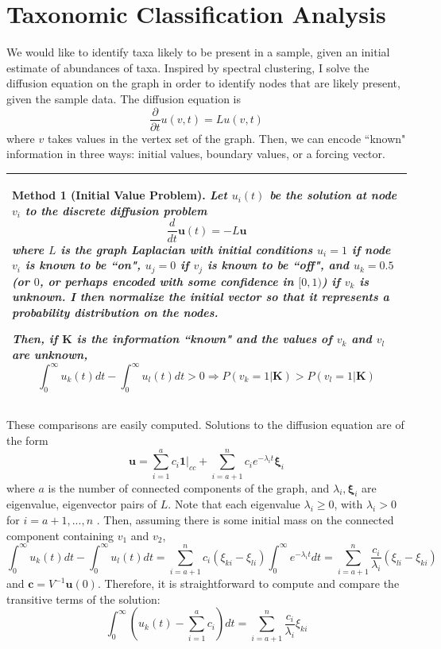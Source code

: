 \documentclass[10pt]{article}
\newtheorem{method}{Method}
\theoremstyle{definition}
\numberwithin{theorem}{section}
\numberwithin{definition}{section}
\numberwithin{lemma}{section}
\numberwithin{corollary}{section}
\numberwithin{clm}{section}
\numberwithin{rmk}{section}
\newenvironment{inbox2}
{\begin{center}
		\begin{tabular}{|p{0.9\textwidth}|}
			\hline \vspace{-0.5 cm}
		}
		{ 
			\\ \hline
		\end{tabular} 
	\end{center}
}
\renewcommand{\b}{\bm}
\begin{document}
\section{Taxonomic Classification Analysis}


We would like to identify taxa likely to be present in a sample, given an initial estimate of abundances of taxa. Inspired by spectral clustering, I solve the diffusion equation on the graph in order to identify nodes that are likely present, given the sample data. The diffusion equation is
\[
\frac{\partial}{\partial t} u(v,t) = L u(v,t)
\]
where $v$ takes values in the vertex set of the graph. Then, we can encode ``known" information in three ways: initial values, boundary values, or a forcing vector.

\begin{inbox2}
	\begin{method}[Initial Value Problem]\label{initalCond}
		Let $u_i(t)$ be the solution at node $v_i$ to the discrete diffusion problem
		\[
		\frac{d}{dt}\b{u}(t)  = - L\b{u}
		\]
		where $L$ is the  graph Laplacian with initial conditions $u_i = 1$ if node $v_i$ is known to be ``on", $u_j = 0$ if $v_j$ is known to be ``off", and $u_k = 0.5$ (or $0$, or perhaps encoded with some confidence in $[0,1)$) if $v_k$ is unknown. I then normalize the initial vector so that it represents a probability distribution on the nodes.
		
		Then, if $\b{K}$ is the information ``known" and the values of $v_{k}$ and $v_{l}$ are unknown,
		\[
		\int_0^{\infty} u_k(t) dt - \int_0^{\infty} u_l(t) dt >  0 \Rightarrow  P(v_k=  1|\b{K}) > P(v_l = 1|\b{K})
		\]
	\end{method}
\end{inbox2}
These comparisons are easily computed. Solutions to the diffusion equation are of the form
\[
\b{u} = \sum_{i=1}^a c_i \b{1}|_{cc} + \sum_{i=a+1}^n c_i e^{-\lambda_i t} \b{\xi}_i 
\]
where $a$ is the number of connected components of the graph, and $\lambda_i,\b{\xi}_i$ are eigenvalue, eigenvector pairs of $L$. Note that each eigenvalue $\lambda_i \geq 0$, with $\lambda_i>0$ for $i = a+1,...,n$ \cite{vonLuxburg2007}. Then, assuming there is some initial mass on the connected component containing $v_1$ and $v_2$, 
\[
\int_0^{\infty} u_k(t) dt - \int_0^{\infty} u_l(t) dt =   \sum_{i=a+1}^n c_i  (\xi_{ki} - \xi_{li}) \int_0^{\infty} e^{-\lambda_i t} dt = \sum_{i=a+1}^n \frac{c_i}{\lambda_i}  (\xi_{li} - \xi_{ki}) 
\]
and $\b{c} = V^{-1}\b{u}(0)$. Therefore, it is straightforward to compute and compare the transitive terms of the solution:
\begin{equation}\label{ivp_computation}
\int_0^{\infty}\left( u_k(t) - \sum_{i=1}^a c_i \right) dt = \sum_{i=a+1}^n \frac{c_i}{\lambda_i}\xi_{ki}
\end{equation}
\end{document}
